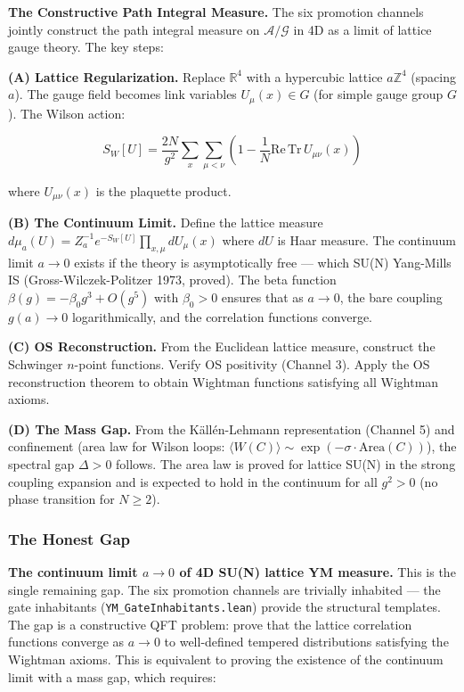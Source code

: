 \documentclass[10pt,a4paper]{article}
\begin{document}
\textbf{The Constructive Path Integral Measure.} The six promotion channels jointly construct the path integral measure on $\mathcal{A}/\mathcal{G}$ in 4D as a limit of lattice gauge theory. The key steps:

\textbf{(A) Lattice Regularization.} Replace $\mathbb{R}^4$ with a hypercubic lattice $a\mathbb{Z}^4$ (spacing $a$). The gauge field becomes link variables $U_{\mu}(x) \in G$ (for simple gauge group $G$). The Wilson action:

\[S_W[U] = \frac{2N}{g^2} \sum_x \sum_{\mu<\nu} \left(1 - \frac{1}{N}\text{Re}\,\text{Tr}\,U_{\mu\nu}(x)\right)\]

where $U_{\mu\nu}(x)$ is the plaquette product.

\textbf{(B) The Continuum Limit.} Define the lattice measure $d\mu_a(U) = Z_a^{-1} e^{-S_W[U]} \prod_{x,\mu} dU_{\mu}(x)$ where $dU$ is Haar measure. The continuum limit $a \to 0$ exists if the theory is asymptotically free --- which SU(N) Yang-Mills IS (Gross-Wilczek-Politzer 1973, proved). The beta function $\beta(g) = -\beta_0 g^3 + O(g^5)$ with $\beta_0 > 0$ ensures that as $a \to 0$, the bare coupling $g(a) \to 0$ logarithmically, and the correlation functions converge.

\textbf{(C) OS Reconstruction.} From the Euclidean lattice measure, construct the Schwinger $n$-point functions. Verify OS positivity (Channel 3). Apply the OS reconstruction theorem to obtain Wightman functions satisfying all Wightman axioms.

\textbf{(D) The Mass Gap.} From the Källén-Lehmann representation (Channel 5) and confinement (area law for Wilson loops: $\langle W(C) \rangle \sim \exp(-\sigma \cdot \text{Area}(C))$), the spectral gap $\Delta > 0$ follows. The area law is proved for lattice SU(N) in the strong coupling expansion and is expected to hold in the continuum for all $g^2 > 0$ (no phase transition for $N \geq 2$).

\subsubsection{The Honest Gap}

\textbf{The continuum limit $a \to 0$ of 4D SU(N) lattice YM measure.} This is the single remaining gap. The six promotion channels are trivially inhabited --- the gate inhabitants (\texttt{YM\_\allowbreak GateInhabitants.\allowbreak lean}) provide the structural templates. The gap is a constructive QFT problem: prove that the lattice correlation functions converge as $a \to 0$ to well-defined tempered distributions satisfying the Wightman axioms. This is equivalent to proving the existence of the continuum limit with a mass gap, which requires:
\end{document}
